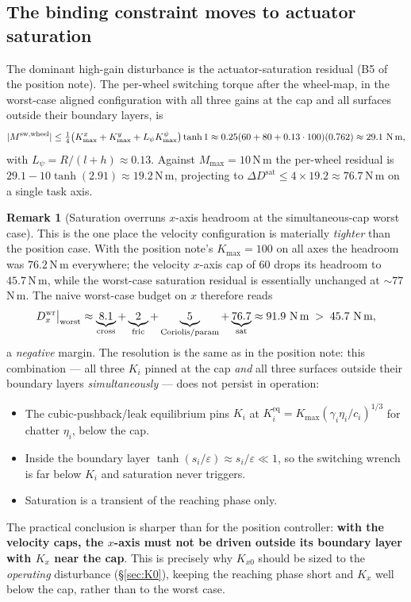 \documentclass[11pt]{article}
\theoremstyle{plain}
\theoremstyle{definition}
\newtheorem{remark}{Remark}
\newcommand{\Dwr}{D^{\mathrm{wr}}}
\newcommand{\Kmax}{K_{\max}}
\newcommand{\Tr}[1]{\tanh\!\left(#1\right)}
\begin{document}
\subsection{The binding constraint moves to actuator saturation}
The dominant high-gain disturbance is the actuator-saturation residual (B5 of the
position note). The per-wheel switching torque after the wheel-map, in the
worst-case aligned configuration with all three gains at the cap and all surfaces
outside their boundary layers, is
\[
|M^{\mathrm{sw,wheel}}|\le\tfrac14\big(\Kmax^x+\Kmax^y+L_\psi\Kmax^\psi\big)\tanh1
\approx0.25(60+80+0.13\cdot100)(0.762)\approx29.1\ \text{N\,m},
\]
with $L_\psi=R/(l+h)\approx0.13$. Against $M_{\max}=10\,$N\,m the per-wheel residual is
$29.1-10\tanh(2.91)\approx19.2\,$N\,m, projecting to
$\Delta D^{\mathrm{sat}}\le4\times19.2\approx76.7\,$N\,m on a single task axis.

\begin{remark}[Saturation overruns $x$-axis headroom at the simultaneous-cap worst case]
This is the one place the velocity configuration is materially \emph{tighter} than the
position case. With the position note's $\Kmax=100$ on all axes the headroom was
$76.2\,$N\,m everywhere; the velocity $x$-axis cap of $60$ drops its headroom to
$45.7\,$N\,m, while the worst-case saturation residual is essentially unchanged at
${\sim}77\,$N\,m. The naive worst-case budget on $x$ therefore reads
\[
\Dwr_x\big|_{\text{worst}}\approx
\underbrace{8.1}_{\text{cross}}+\underbrace{2}_{\text{fric}}+\underbrace{5}_{\text{Coriolis/param}}+\underbrace{76.7}_{\text{sat}}
\approx91.9\ \text{N\,m}\;>\;45.7\ \text{N\,m},
\]
a \emph{negative} margin. The resolution is the same as in the position note: this
combination --- all three $K_i$ pinned at the cap \emph{and} all three surfaces
outside their boundary layers \emph{simultaneously} --- does not persist in operation:
\begin{itemize}[leftmargin=1.5em]
\item The cubic-pushback/leak equilibrium pins $K_i$ at
$K_i^{\mathrm{eq}}=\Kmax(\gamma_i\eta_i/c_i)^{1/3}$ for chatter $\eta_i$, below the cap.
\item Inside the boundary layer $\Tr{s_i/\varepsilon}\approx s_i/\varepsilon\ll1$, so the
switching wrench is far below $K_i$ and saturation never triggers.
\item Saturation is a transient of the reaching phase only.
\end{itemize}
The practical conclusion is sharper than for the position controller: \textbf{with the
velocity caps, the $x$-axis must not be driven outside its boundary layer with $K_x$
near the cap}. This is precisely why $K_{x0}$ should be sized to the \emph{operating}
disturbance (\S\ref{sec:K0}), keeping the reaching phase short and $K_x$ well below the
cap, rather than to the worst case.
\end{remark}
\end{document}
